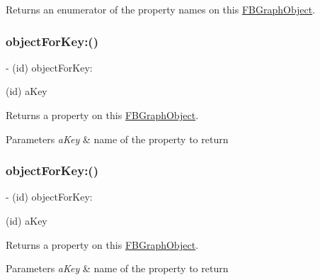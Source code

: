 Returns an enumerator of the property names on this {\ttfamily \hyperlink{interfaceFBGraphObject}{F\+B\+Graph\+Object}}. \mbox{\label{protocolFBGraphObject-p_a2ca53cdc300a46e5cdbfe0a2ae705f45}} 
\subsubsection{\texorpdfstring{object\+For\+Key\+:()}{objectForKey:()}\hspace{0.1cm}{\footnotesize\ttfamily [1/5]}}
{\footnotesize\ttfamily -\/ (id) object\+For\+Key\+: \begin{DoxyParamCaption}\item[{(id)}]{a\+Key }\end{DoxyParamCaption}}

Returns a property on this {\ttfamily \hyperlink{interfaceFBGraphObject}{F\+B\+Graph\+Object}}.


\begin{DoxyParams}{Parameters}
{\em a\+Key} & name of the property to return \\
\hline
\end{DoxyParams}
\mbox{\label{protocolFBGraphObject-p_a2ca53cdc300a46e5cdbfe0a2ae705f45}} 
\subsubsection{\texorpdfstring{object\+For\+Key\+:()}{objectForKey:()}\hspace{0.1cm}{\footnotesize\ttfamily [2/5]}}
{\footnotesize\ttfamily -\/ (id) object\+For\+Key\+: \begin{DoxyParamCaption}\item[{(id)}]{a\+Key }\end{DoxyParamCaption}}

Returns a property on this {\ttfamily \hyperlink{interfaceFBGraphObject}{F\+B\+Graph\+Object}}.


\begin{DoxyParams}{Parameters}
{\em a\+Key} & name of the property to return \\
\hline
\end{DoxyParams}
\mbox{\label{protocolFBGraphObject-p_a2ca53cdc300a46e5cdbfe0a2ae705f45}} 
